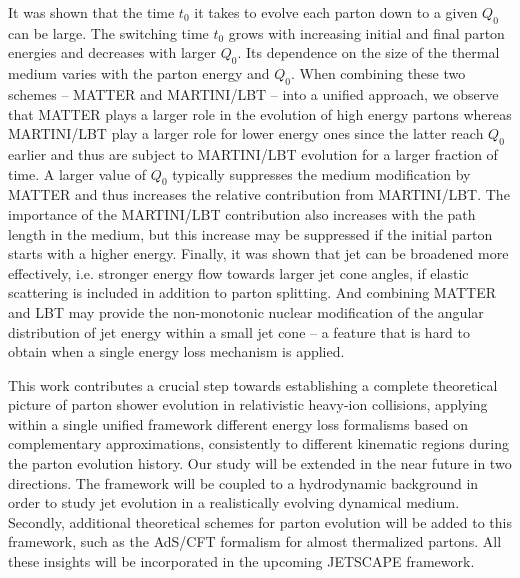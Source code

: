\documentclass[aps,prc,twocolumn,floatfix,superscriptaddress,nofootinbib]{revtex4}
\begin{document}
It was shown that the time $t_0$ it takes to evolve each parton down to a given $Q_0$ can be large. The switching time $t_0$ grows with increasing initial and final parton energies and decreases with larger $Q_0$. Its dependence on the size of the thermal medium varies with the parton energy and $Q_0$. When combining these two schemes -- MATTER and MARTINI/LBT -- into a unified approach, we observe that MATTER plays a larger role in the evolution of high energy partons whereas MARTINI/LBT play a larger role for lower energy ones since the latter reach $Q_0$ earlier and thus are subject to MARTINI/LBT evolution for a larger fraction of time. A larger value of $Q_0$ typically suppresses the medium modification by MATTER and thus increases the relative contribution from MARTINI/LBT. The importance of the MARTINI/LBT contribution also increases with the path length in the medium, but this increase may be suppressed if the initial parton starts with a higher energy. Finally, it was shown that jet can be broadened more effectively, i.e. stronger energy flow towards larger jet cone angles, if elastic scattering is included in addition to parton splitting. And combining MATTER and LBT may provide the non-monotonic nuclear modification of the angular distribution of jet energy within a small jet cone -- a feature that is hard to obtain when a single energy loss mechanism is applied.

This work contributes a crucial step towards establishing a complete theoretical picture of parton shower evolution in relativistic heavy-ion collisions, applying within a single unified framework different energy loss formalisms based on complementary approximations, consistently to different kinematic regions during the parton evolution history. Our study will be extended in the near future in two directions. The framework will be coupled to a hydrodynamic background in order to study jet evolution in a realistically evolving dynamical medium. Secondly, additional theoretical schemes for parton evolution will be added to this framework, such as the AdS/CFT formalism for almost thermalized partons. All these insights will be incorporated in the upcoming JETSCAPE framework. 

\end{document}
